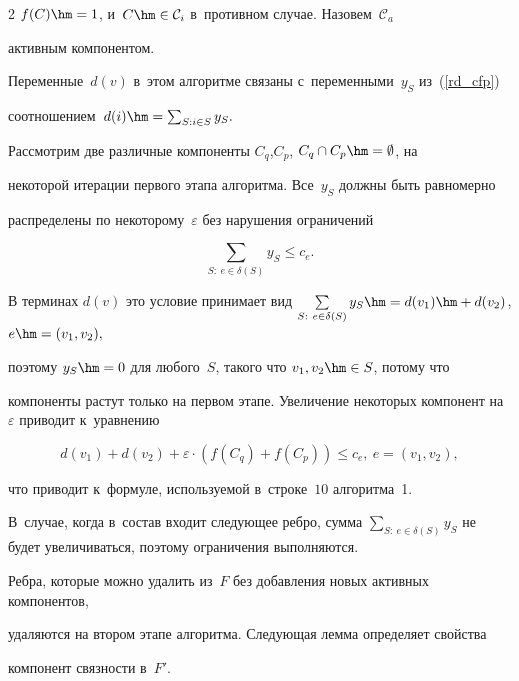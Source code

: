 \begin{multicols}{2}
$f(C) \hm= 1$, и~$C\hm\in\mathcal{C}_i$ в~противном случае. Назовем~$\mathcal{C}_a$ 

активным компонентом.

Переменные~$d(v)$ в~этом алгоритме связаны с~переменными~$y_S$ из~(\ref{rd_cfp}) 

соотношением~$d(i) \hm= \sum\nolimits_{S:i\in S}y_S.$ 



Рассмотрим две различные компоненты $C_q$,$C_p$, $C_q\cap C_p\hm=\emptyset$, на 

некоторой итерации первого этапа алгоритма. Все~$y_S$ должны быть равномерно 

распределены по некоторому~$\varepsilon$ без нарушения ограничений

$$

\sum\limits_ {S:~e\in \delta(S)}y_S\leqslant c_e. 

$$

В терминах $d(v)$ это условие принимает вид $\sum\limits_{S:~e\in \delta(S)}y_S 

\hm= d(v_1)\hm+d(v_2)$, $e\hm=( v_1,v_2),$

поэтому $y_S\hm=0$ для любого~$S$, такого что $v_1, v_2\hm\in S$, потому что 

компоненты растут только на первом этапе. Увеличение некоторых компонент на~$\varepsilon$ приводит к~уравнению

$$

d(v_1)+d(v_2)+\varepsilon\cdot \left(f(C_q)+f(C_p)\right)\leqslant 

c_e,\ e=\left(v_1,v_2\right), 

$$

что приводит к~формуле, используемой в~строке~$10$ алгоритма~1. 

В~случае, когда в~состав входит следующее ребро, сумма $\sum\nolimits_{S:~e\in 

\delta (S)}y_S$ не будет увеличиваться, поэтому ограничения выполняются.



Ребра, которые можно удалить из~$F$ без добавления новых активных компонентов, 

удаляются на втором этапе алгоритма. Следующая лемма определяет свойства 

компонент связ\-ности в~$F'$.





\smallskip



\noindent


\end{multicols}

